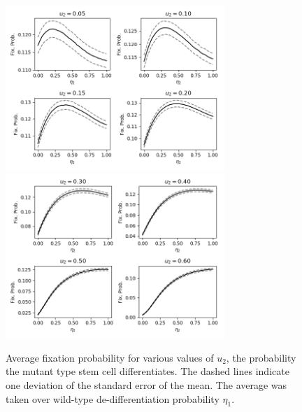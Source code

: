 \documentclass[12pt]{article}
\begin{document}
\begin{figure}[H]
\begin{center}
\includegraphics[width=0.74\textwidth]{avg_eta1_u2_stackplot1.png}\\
\includegraphics[width=0.74\textwidth]{avg_eta1_u2_stackplot2.png}
\end{center}
\caption{Average fixation probability for various values of $u_2$, the probability the mutant type stem cell differentiates. The dashed lines indicate one deviation of the standard error of the mean. The average was taken over wild-type de-differentiation probability $\eta_1$.}\label{u2_stack1}
\end{figure}
\end{document}
